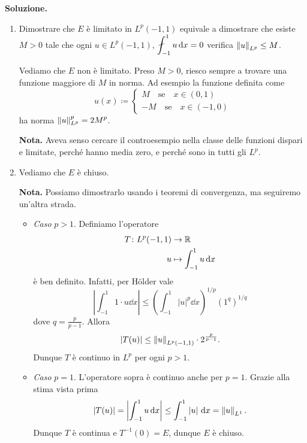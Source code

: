 \textbf{Soluzione.}
\begin{enumerate}
\item Dimostrare che $E$ è limitato in $L^p(-1,1)$ equivale a dimostrare che esiste $M > 0$ tale che ogni  $u \in L^p(-1,1)$, $\ds \fint_{-1}^1 u \dd x = 0$ verifica $\left\lVert u \right\rVert_{L^p} \leq M$.

Vediamo che $E$ non è limitato.
Preso $M > 0$, riesco sempre a trovare una funzione maggiore di $M$ in norma.
Ad esempio la funzione definita come
%
$$
u(x) \coloneqq
\begin{cases}
M \quad \text{se} \quad x \in (0,1) \\
-M \quad \text{se} \quad x \in (-1,0)
\end{cases} 
$$
%
ha norma $\displaystyle \left\lVert u \right\rVert_{L^p}^p = 2 M^p$.

\textbf{Nota.} Aveva senso cercare il controesempio nella classe delle funzioni dispari e limitate, perché hanno media zero, e perché sono in tutti gli $L^p$.

\item Vediamo che $E$ è chiuso.

\textbf{Nota.} Possiamo dimostrarlo usando i teoremi di convergenza, ma seguiremo un'altra strada.

\begin{itemize}
\item \textit{Caso} $p > 1$. Definiamo l'operatore 
\begin{align*}
T \colon L^p(-1,1) & \to \mathbb R \\
u & \mapsto \int_{-1}^{1} u \,\mathrm{d} x 
\end{align*}
è ben definito.
Infatti, per Hölder vale
%
$$
\left| \int_{-1}^{1} 1 \cdot u \dd x  \right| \leq \left( \int_{-1}^{1} \left| u \right|^p \dd x  \right)^{1/p} \left( 1^q \right)^{1/q}
$$
%
dove $q = \frac{p}{p-1}$.
Allora
$$
\left| T(u) \right| \leq \left\lVert u \right\rVert_{L^p(-1,1)} \cdot 2^{\frac{p}{p-1}}.
$$
%
Dunque $T$ è continuo in $L^p$ per ogni $p > 1$.

\item \textit{Caso} $p = 1$. L'operatore sopra è continuo anche per $p = 1$. Grazie alla stima vista prima
%
$$
\left| T(u) \right| = \left| \int_{-1}^{1} u \,\mathrm{d} x  \right| \leq \int_{-1}^{1} \left| u \right| \,\mathrm{d} x = \left\lVert u \right\rVert_{L^1}.
$$
%
Dunque $T$ è continua e $T^{-1}(0) = E$, dunque $E$ è chiuso.

\end{itemize}

\end{enumerate}

